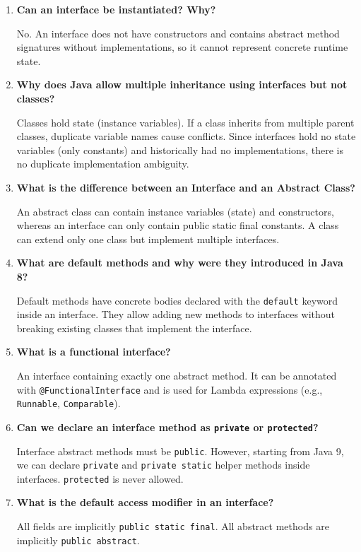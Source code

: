 \documentclass[12pt,a4paper]{article}
\newcommand{\Q}[1]{\textbf{#1}\par\noindent\ignorespaces}
\begin{document}
\begin{tcolorbox}[exambox, title={\textbf{Frequently Asked / Viva Questions}}]
\begin{enumerate}[leftmargin=*, label=\textbf{Q\arabic*.}, itemsep=5pt]
  \item \Q{Can an interface be instantiated? Why?}
        No. An interface does not have constructors and contains abstract method signatures without implementations, so it cannot represent concrete runtime state.
        
  \item \Q{Why does Java allow multiple inheritance using interfaces but not classes?}
        Classes hold state (instance variables). If a class inherits from multiple parent classes, duplicate variable names cause conflicts. Since interfaces hold no state variables (only constants) and historically had no implementations, there is no duplicate implementation ambiguity.
        
  \item \Q{What is the difference between an Interface and an Abstract Class?}
        An abstract class can contain instance variables (state) and constructors, whereas an interface can only contain public static final constants. A class can extend only one class but implement multiple interfaces.
        
  \item \Q{What are default methods and why were they introduced in Java 8?}
        Default methods have concrete bodies declared with the \texttt{default} keyword inside an interface. They allow adding new methods to interfaces without breaking existing classes that implement the interface.
        
  \item \Q{What is a functional interface?}
        An interface containing exactly one abstract method. It can be annotated with \texttt{@FunctionalInterface} and is used for Lambda expressions (e.g., \texttt{Runnable}, \texttt{Comparable}).
        
  \item \Q{Can we declare an interface method as \texttt{private} or \texttt{protected}?}
        Interface abstract methods must be \texttt{public}. However, starting from Java 9, we can declare \texttt{private} and \texttt{private static} helper methods inside interfaces. \texttt{protected} is never allowed.
        
  \item \Q{What is the default access modifier in an interface?}
        All fields are implicitly \texttt{public static final}. All abstract methods are implicitly \texttt{public abstract}.
        

\end{enumerate}
\end{tcolorbox}
\end{document}
